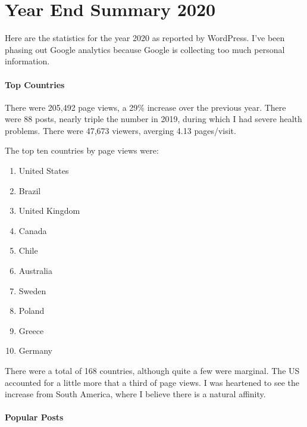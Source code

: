 \section{Year End Summary 2020}

Here are the statistics for the year 2020 as reported by WordPress. I've been phasing out Google analytics because Google is collecting too much personal information.

\paragraph{Top Countries}


There were 205,492 page views, a 29\% increase over the previous year. There were 88 posts, nearly triple the number in 2019, during which I had severe health problems. There were 47,673 viewers, averging 4.13 pages/visit.

The top ten countries by page views were:

\begin{enumerate}


\item United States

\item Brazil

\item United Kingdom

\item Canada

\item Chile

\item Australia

\item Sweden

\item Poland

\item Greece

\item Germany
\end{enumerate}


There were a total of 168 countries, although quite a few were marginal. The US accounted for a little more that a third of page views. I was heartened to see the increase from South America, where I believe there is a natural affinity.

\paragraph{Popular Posts}


